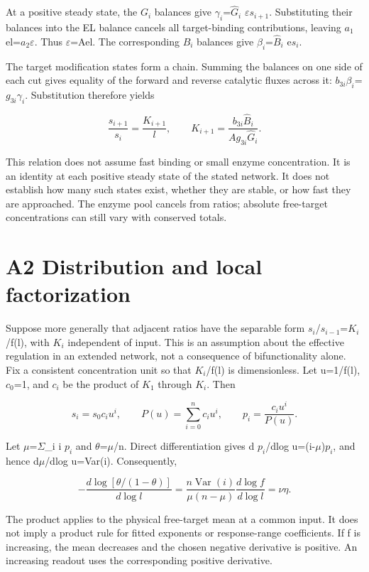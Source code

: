 \documentclass[11pt]{article}
\begin{document}
At a positive steady state, the $G_i$ balances give $\gamma_i$=$\widehat G_i$ $\varepsilon$$s_{i+1}$. Substituting their balances into the EL balance cancels all target-binding contributions, leaving $a_1$el=$a_2$$\varepsilon$. Thus $\varepsilon$=Ael. The corresponding $B_i$ balances give $\beta_i$=$\widehat B_i$ e$s_i$.


The target modification states form a chain. Summing the balances on one side of each cut gives equality of the forward and reverse catalytic fluxes across it: $b_{3i}$$\beta_i$=$g_{3i}$$\gamma_i$. Substitution therefore yields


\[
\frac{s_{i+1}}{s_i}=\frac{K_{i+1}}{l},\qquad
K_{i+1}=\frac{b_{3i}\widehat B_i}{A g_{3i}\widehat G_i}. \tag{S6}
\]

This relation does not assume fast binding or small enzyme concentration. It is an identity at each positive steady state of the stated network. It does not establish how many such states exist, whether they are stable, or how fast they are approached. The enzyme pool cancels from ratios; absolute free-target concentrations can still vary with conserved totals.


\section*{A2 Distribution and local factorization}

Suppose more generally that adjacent ratios have the separable form $s_i$/$s_{i-1}$=$K_i$/f(l), with $K_i$ independent of input. This is an assumption about the effective regulation in an extended network, not a consequence of bifunctionality alone. Fix a consistent concentration unit so that $K_i$/f(l) is dimensionless. Let u=1/f(l), $c_0$=1, and $c_i$ be the product of $K_1$ through $K_i$. Then


\[
s_i=s_0c_i u^i,\qquad P(u)=\sum_{i=0}^{n}c_i u^i,\qquad
p_i=\frac{c_i u^i}{P(u)}. \tag{S7}
\]

Let $\mu$=$\Sigma$\_i i $p_i$ and $\theta$=$\mu$/n. Direct differentiation gives d $p_i$/dlog u=(i-$\mu$)$p_i$, and hence d$\mu$/dlog u=Var(i). Consequently,


\[
-\frac{d\log[\theta/(1-\theta)]}{d\log l}
=\frac{n\operatorname{Var}(i)}{\mu(n-\mu)}\frac{d\log f}{d\log l}
=\nu\eta. \tag{S8}
\]

The product applies to the physical free-target mean at a common input. It does not imply a product rule for fitted exponents or response-range coefficients. If f is increasing, the mean decreases and the chosen negative derivative is positive. An increasing readout uses the corresponding positive derivative.
\end{document}
